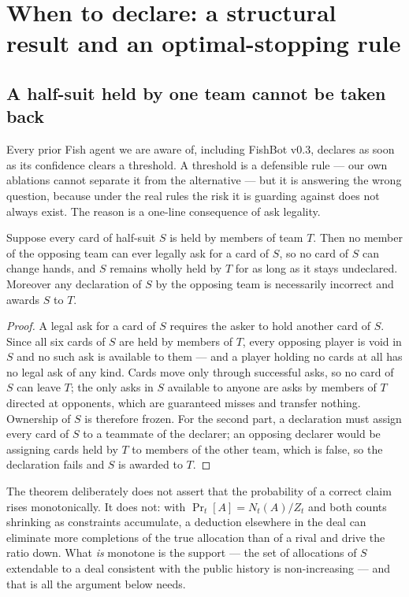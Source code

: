 \section{When to declare: a structural result and an optimal-stopping rule}
\label{sec:theory}

\subsection{A half-suit held by one team cannot be taken back}

Every prior Fish agent we are aware of, including FishBot v0.3, declares as soon
as its confidence clears a threshold. A threshold is a defensible rule --- our
own ablations cannot separate it from the alternative --- but it is answering the
wrong question, because under the real rules the risk it is guarding against does
not always exist. The reason is a one-line consequence of ask legality.

\begin{theorem}
\label{thm:locked}
Suppose every card of half-suit $S$ is held by members of team $T$. Then no
member of the opposing team can ever legally ask for a card of $S$, so no card of
$S$ can change hands, and $S$ remains wholly held by $T$ for as long as it stays
undeclared. Moreover any declaration of $S$ by the opposing team is necessarily
incorrect and awards $S$ to $T$.
\end{theorem}

\begin{proof}
A legal ask for a card of $S$ requires the asker to hold another card of $S$.
Since all six cards of $S$ are held by members of $T$, every opposing player is
void in $S$ and no such ask is available to them --- and a player holding no
cards at all has no legal ask of any kind. Cards move only through successful
asks, so no card of $S$ can leave $T$; the only asks in $S$ available to anyone
are asks by members of $T$ directed at opponents, which are guaranteed misses and
transfer nothing. Ownership of $S$ is therefore frozen. For the second part, a
declaration must assign every card of $S$ to a teammate of the declarer; an
opposing declarer would be assigning cards held by $T$ to members of the other
team, which is false, so the declaration fails and $S$ is awarded to $T$.
\end{proof}

The theorem deliberately does not assert that the probability of a correct claim
rises monotonically. It does not: with $\Pr_t[A] = N_t(A)/Z_t$ and both counts
shrinking as constraints accumulate, a deduction elsewhere in the deal can
eliminate more completions of the true allocation than of a rival and drive the
ratio down. What \emph{is} monotone is the support --- the set of allocations of
$S$ extendable to a deal consistent with the public history is non-increasing ---
and that is all the argument below needs.

